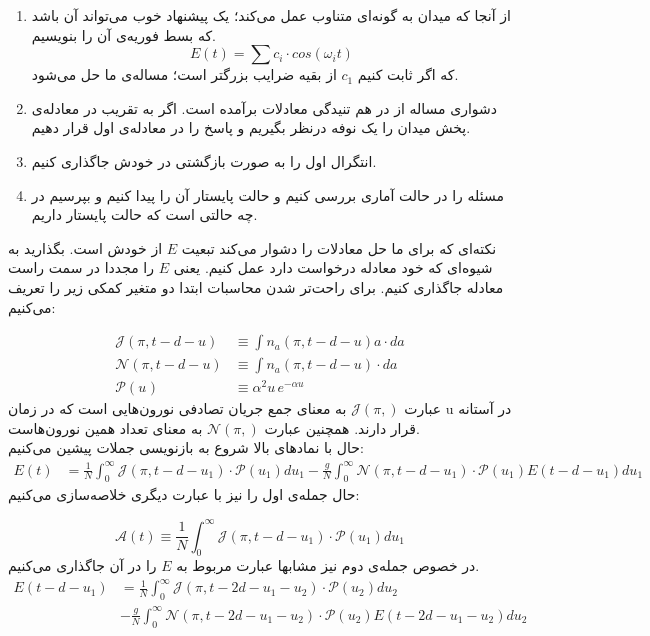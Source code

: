 \begin{enumerate}[1.]
	\item
	از آنجا که میدان به گونه‌ای متناوب عمل می‌کند؛ یک پیشنهاد خوب می‌تواند آن باشد که بسط فوریه‌ی آن را بنویسیم.
	\begin{equation}
		E(t) = \sum c_i \cdot cos(\omega_i t)
	\end{equation}
	که اگر ثابت کنیم $c_1$ از بقیه ضرایب بزرگتر است؛ مساله‌ی ما حل می‌شود.
	\item
	دشواری مساله از در هم تنیدگی معادلات برآمده است. اگر به تقریب در معادله‌ی پخش میدان را یک نوفه درنظر بگیریم و پاسخ را در معادله‌ی اول قرار دهیم.
	\item
	انتگرال اول را به صورت بازگشتی در خودش جاگذاری کنیم.
	\item
	مسئله را در حالت آماری بررسی کنیم و حالت پایستار آن را پیدا کنیم و  بپرسیم در چه حالتی است که حالت پایستار داریم.
\end{enumerate}



نکته‌ای که برای ما حل معادلات را دشوار می‌کند تبعیت $E$ از خودش است. بگذارید به شیوه‌ای که خود معادله درخواست دارد عمل کنیم. یعنی $E$ را مجددا در سمت راست معادله جاگذاری کنیم. برای راحت‌تر شدن محاسبات ابتدا دو متغیر کمکی زیر را تعریف می‌کنیم:
\newcommand{\J}[1]{\mathcal{J}(\pi,#1)}
\newcommand{\N}[1]{\mathcal{N}(\pi, #1)}
\newcommand{\Pexp}[1]{\mathcal{P}(u_{#1})}

\newcommand{\A}[1]{\mathcal{A}(#1)}

%
\begin{align}
	\J{t-d-u} &\equiv \int n_a(\pi,t-d-u) a \cdot da\\
	\N{t-d-u} &\equiv \int n_a(\pi,t-d-u) \cdot da\\
	\Pexp{} &\equiv \alpha^2 u\, e^{-\alpha u}
\end{align}
عبارت $\J{}$ به معنای جمع جریان تصادفی نورون‌هایی است که در زمان u در آستانه قرار دارند. همچنین عبارت $\N{}$ به معنای تعداد همین نورون‌هاست.\\
حال با نمادهای بالا شروع به بازنویسی جملات پیشین می‌کنیم:
\begin{align}
	E(t) &= \frac{1}{N} \int_{0}^{\infty} \J{t-d-u_1} \cdot \Pexp{1} du_1  - \frac{g}{N}\int_{0}^{\infty} \N{t-d-u_1} \cdot \Pexp{1} E(t-d-u_1)  du_1
\end{align}
حال جمله‌ی اول را نیز با عبارت دیگری خلاصه‌سازی می‌کنیم:

\begin{equation}
	\A{t} \equiv \frac{1}{N}\int_{0}^{\infty} \J{t-d-u_1} \cdot \Pexp{1} du_1
\end{equation}
در خصوص جمله‌ی دوم نیز مشابها عبارت مربوط به $E$ را در آن جاگذاری می‌کنیم.
\begin{align}
	E(t - d - u_1) &= \frac{1}{N} \int_{0}^{\infty} \J{t-2d-u_1-u_2} \cdot \Pexp{2} du_2\\
	&- \frac{g}{N}\int_{0}^{\infty} \N{t-2d-u_1-u_2} \cdot \Pexp{2} E(t-2d-u_1-u_2)  du_2
\end{align}

